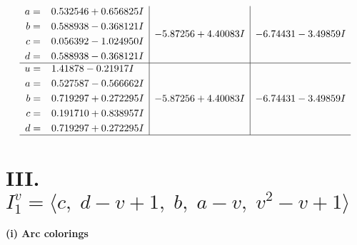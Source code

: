 \documentclass[1p]{elsarticle_modified}
\theoremstyle{definition}
\begin{document}
$$\begin{array}{c|c|c}
\begin{aligned}
a &= \phantom{-}0.532546 + 0.656825 I \\
b &= \phantom{-}0.588938 - 0.368121 I \\
c &= \phantom{-}0.056392 - 1.024950 I \\
d &= \phantom{-}0.588938 - 0.368121 I\end{aligned}
 & -5.87256 + 4.40083 I & -6.74431 - 3.49859 I \\ \hline\begin{aligned}
u &= \phantom{-}1.41878 - 0.21917 I \\
a &= \phantom{-}0.527587 - 0.566662 I \\
b &= \phantom{-}0.719297 + 0.272295 I \\
c &= \phantom{-}0.191710 + 0.838957 I \\
d &= \phantom{-}0.719297 + 0.272295 I\end{aligned}
 & -5.87256 + 4.40083 I & -6.74431 - 3.49859 I\\
 \hline 
 \end{array}$$\newpage\newpage\renewcommand{\arraystretch}{1}
\centering \section*{III. $I^v_{1}= \langle c,\;d- v+1,\;b,\;a- v,\;v^2- v+1 \rangle$}
\flushleft \textbf{(i) Arc colorings}\\
\end{document}
